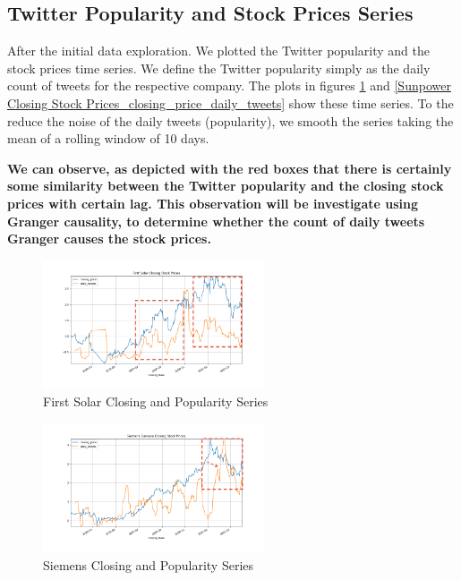 \documentclass[sigconf, nonacm]{acmart}
\begin{document}
\subsection{Twitter Popularity and Stock Prices Series} 
After the initial data exploration. We plotted the Twitter popularity and the stock prices time series. We define the Twitter popularity simply as the daily count of tweets for the respective company. The plots in figures \ref{First Solar Closing Stock Prices_closing_price_daily_tweets} and \ref{Sunpower Closing Stock Prices_closing_price_daily_tweets} show these time series. To the reduce the noise of the daily tweets (popularity), we smooth the series taking the mean of a rolling window of 10 days. \newline 

\textbf{We can observe, as depicted with the red boxes that there is certainly some similarity between the Twitter popularity and the closing stock prices with certain lag. This observation will be investigate using Granger causality, to determine whether the count of daily tweets Granger causes the stock prices.}

\begin{figure}[H]
  \centering
  \includegraphics[width=\linewidth, height =1.5in]{popularity_time_series/First Solar Closing Stock Prices_closing_price_daily_tweets.png}
  \caption{First Solar Closing and Popularity Series}
  \label{First Solar Closing Stock Prices_closing_price_daily_tweets} 
\end{figure}

\begin{figure}[H]
  \centering
  \includegraphics[width=\linewidth, height =1.5in]{popularity_time_series/Siemens Gamesa Closing Stock Prices_closing_price_daily_tweets.png}
  \caption{Siemens Closing and Popularity Series}
  \label{Siemens Gamesa Closing Stock Prices_closing_price_daily_tweets}
\end{figure}
\end{document}
